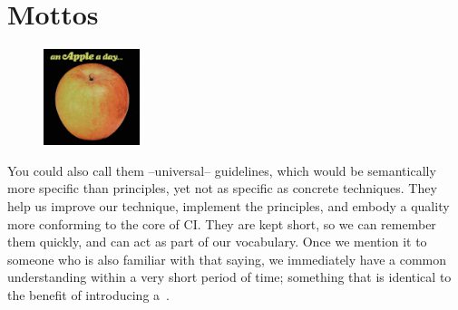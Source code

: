 \section{Mottos}\label{sec:mottos}

\begin{figure}
    \centering
    \includegraphics[width=0.25\textwidth]{images/mottos}
\end{figure}

You could also call them --universal-- guidelines, which would be semantically more specific than principles, yet not as specific as concrete techniques.
They help us improve our technique, implement the principles, and embody a quality more conforming to the core of CI\@.
They are kept short, so we can remember them quickly, and can act as part of our vocabulary.
Once we mention it to someone who is also familiar with that saying, we immediately have a common understanding within a very short period of time; something that is identical to the benefit of introducing a~.

